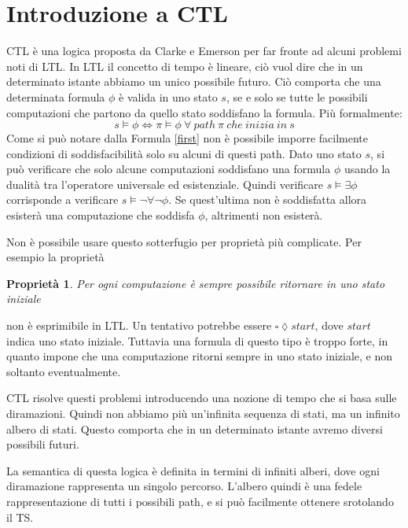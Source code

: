 \documentclass[a4paper, 10pt]{article}
\newtheorem{prop}{Proprietà}
\numberwithin{equation}{theor}
\begin{document}
\section{Introduzione a \ac*{CTL}}
\acf{CTL} è una logica proposta da Clarke e Emerson per far fronte ad alcuni problemi noti di \ac{LTL}. In \ac{LTL} il concetto di tempo è lineare, ciò vuol dire che in un determinato istante abbiamo un unico possibile futuro. Ciò comporta che una determinata formula $\phi$ è valida in uno stato $s$, se e solo se tutte le possibili computazioni che partono da quello stato soddisfano la formula. Più formalmente:
\begin{equation}\label{first}
    s \models \phi \iff \pi \models \phi \ \forall \  path \  \pi \ che\  inizia\  in\  s
\end{equation}
Come si può notare dalla Formula \eqref{first} non è possibile imporre facilmente condizioni di soddisfacibilità solo su alcuni di questi path. Dato uno stato $s$, si può verificare che solo alcune computazioni soddisfano una formula $\phi$  usando la dualità tra l'operatore universale ed esistenziale. Quindi verificare  $ s \models  \exists \phi $ corrisponde a verificare $s \models \neg \forall \neg \phi $. Se quest'ultima non è soddisfatta allora esisterà una computazione che soddisfa $\phi$, altrimenti non esisterà. \par
Non è possibile usare questo sotterfugio per proprietà più complicate. Per esempio la proprietà
\begin{prop}
\label{prop:first}
Per ogni computazione è sempre possibile ritornare in uno stato iniziale
\end{prop}
non è esprimibile in \ac{LTL}. Un tentativo potrebbe essere $\square\lozenge start$, dove $start$ indica uno stato iniziale. Tuttavia una formula di questo tipo è troppo forte, in quanto impone che una computazione ritorni sempre in uno stato iniziale, e non soltanto eventualmente. \par
\ac{CTL} risolve questi problemi introducendo una nozione di tempo che si basa sulle diramazioni. Quindi non abbiamo più un'infinita sequenza di stati, ma un infinito albero di stati. Questo comporta che in un determinato istante avremo diversi possibili futuri.\par
La semantica di questa logica è definita in termini di infiniti alberi, dove ogni diramazione rappresenta un singolo percorso. L'albero quindi è una fedele rappresentazione di tutti i possibili path, e si può facilmente ottenere srotolando il \ac{TS}.\par
\end{document}
